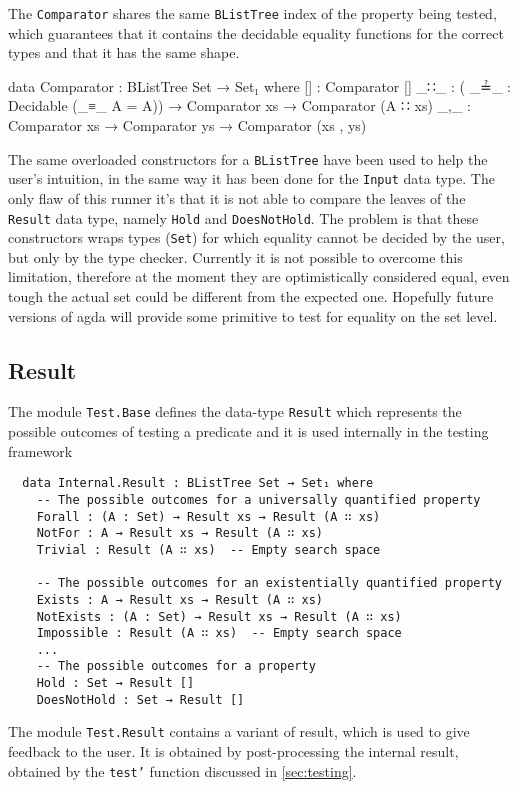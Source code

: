 \documentclass[10pt,a4paper]{article}
\begin{document}
The \texttt{Comparator} shares the same \texttt{BListTree} index  of the property  being tested, which guarantees that it contains the decidable equality functions for the correct types and that it has the same shape.
\begin{code}
data Comparator : BListTree Set → Set₁ where
  [] : Comparator []
  _∷_ : ( _≟_ : Decidable (_≡_ {A = A}))  → Comparator xs → Comparator (A ∷ xs)
  _,_ : Comparator xs → Comparator ys → Comparator (xs , ys)
\end{code}
The same overloaded constructors for a \texttt{BListTree} have been used to help the user's intuition, in the same way it has been done for the \texttt{Input} data type.
The only flaw of this runner it's that it is not able to compare the leaves of the \texttt{Result} data type, namely \texttt{Hold} and \texttt{DoesNotHold}. The problem is that these constructors wraps types (\texttt{Set}) for which equality cannot be decided by the user, but only by the type checker. Currently it is not possible to overcome this limitation, therefore at the moment they are optimistically considered equal, even tough the actual set could be different from the expected one. Hopefully future versions of agda will provide some primitive to test for equality on the set level.

\subsection{Result}
\label{sec:Result}
The module \texttt{Test.Base} defines the data-type \texttt{Result} which represents the possible outcomes of testing a predicate and it is used internally in the testing framework

\begin{verbatim}
  data Internal.Result : BListTree Set → Set₁ where
    -- The possible outcomes for a universally quantified property
    Forall : (A : Set) → Result xs → Result (A ∷ xs)
    NotFor : A → Result xs → Result (A ∷ xs)
    Trivial : Result (A ∷ xs)  -- Empty search space

    -- The possible outcomes for an existentially quantified property
    Exists : A → Result xs → Result (A ∷ xs)
    NotExists : (A : Set) → Result xs → Result (A ∷ xs)
    Impossible : Result (A ∷ xs)  -- Empty search space
    ...	
    -- The possible outcomes for a property
    Hold : Set → Result []
    DoesNotHold : Set → Result []
\end{verbatim}

The module \texttt{Test.Result} contains a variant of result, which is used to give feedback to the user. It is obtained by post-processing the internal result, obtained by the \texttt{test'} function discussed in \ref{sec:testing}.
\end{document}
